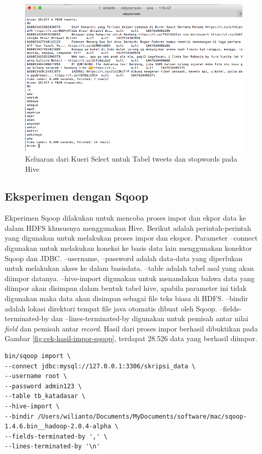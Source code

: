 \begin{figure}
	\centering
	\includegraphics[scale=0.5]{Gambar/cek-hasil-impor-hive.png}
	\caption[Keluaran dari Kueri Select untuk Tabel tweets dan stopwords pada Hive]{Keluaran dari Kueri Select untuk Tabel tweets dan stopwords pada Hive}
	\label{fig:cek-hasil-impor-hive}
\end{figure}


\subsection{Eksperimen dengan Sqoop}
\label{sec:eksperimen-sqoop}
Ekperimen Sqoop dilakukan untuk mencoba proses impor dan ekpor data ke dalam HDFS khususnya menggunakan Hive. Berikut adalah perintah-perintah yang digunakan untuk melakukan proses impor dan ekspor. Parameter --connect digunakan untuk melakukan koneksi ke basis data lain menggunakan konektor Sqoop dan JDBC. --username, --password adalah data-data yang diperlukan untuk melakukan akses ke dalam basisdata. --table adalah tabel asal yang akan diimpor datanya. --hive-import digunakan untuk menandakan bahwa data yang diimpor akan disimpan dalam bentuk tabel hive, apabila parameter ini tidak digunakan maka data akan disimpan sebagai file teks biasa di HDFS. --bindir adalah lokasi direktori tempat file java otomatis dibuat oleh Sqoop. --fields-terminated-by dan --lines-terminated-by digunakan untuk pemisah antar nilai \textit{field} dan pemisah antar \textit{record}. Hasil dari proses impor berhasil dibuktikan pada Gambar \ref{fig:cek-hasil-impor-sqoop}, terdapat 28.526 data yang berhasil diimpor.

\begin{lstlisting}[basicstyle=\tiny,caption=Perintah Sqoop untuk Melakukan Impor]
bin/sqoop import \
--connect jdbc:mysql://127.0.0.1:3306/skripsi_data \
--username root \
--password admin123 \
--table tb_katadasar \
--hive-import \
--bindir /Users/wilianto/Documents/MyDocuments/software/mac/sqoop-1.4.6.bin__hadoop-2.0.4-alpha \
--fields-terminated-by ',' \
--lines-terminated-by '\n'
\end{lstlisting}

